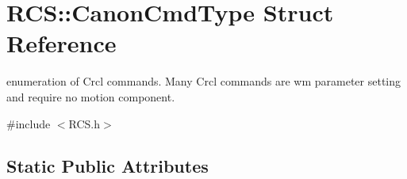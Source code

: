\hypertarget{structRCS_1_1CanonCmdType}{\section{R\-C\-S\-:\-:Canon\-Cmd\-Type Struct Reference}
\label{structRCS_1_1CanonCmdType}
}


enumeration of Crcl commands. Many Crcl commands are wm parameter setting and require no motion component.  




{\ttfamily \#include $<$R\-C\-S.\-h$>$}

\subsection*{Static Public Attributes}
